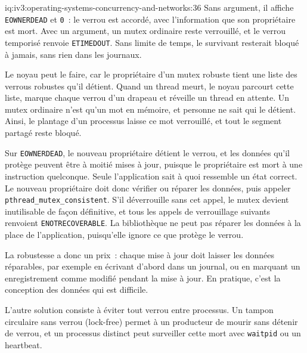 \begin{solution}{iq:iv3:operating-systems-concurrency-and-networks:36}
Sans argument, il affiche \texttt{EOWNERDEAD} et \texttt{0}~: le verrou est accordé, avec l'information que son propriétaire est mort. Avec un argument, un mutex ordinaire reste verrouillé, et le verrou temporisé renvoie \texttt{ETIMEDOUT}. Sans limite de temps, le survivant resterait bloqué à jamais, sans rien dans les journaux.

Le noyau peut le faire, car le propriétaire d'un mutex robuste tient une liste des verrous robustes qu'il détient. Quand un thread meurt, le noyau parcourt cette liste, marque chaque verrou d'un drapeau et réveille un thread en attente. Un mutex ordinaire n'est qu'un mot en mémoire, et personne ne sait qui le détient. Ainsi, le plantage d'un processus laisse ce mot verrouillé, et tout le segment partagé reste bloqué.

Sur \texttt{EOWNERDEAD}, le nouveau propriétaire détient le verrou, et les données qu'il protège peuvent être à moitié mises à jour, puisque le propriétaire est mort à une instruction quelconque. Seule l'application sait à quoi ressemble un état correct. Le nouveau propriétaire doit donc vérifier ou réparer les données, puis appeler \texttt{pthread\_mutex\_consistent}. S'il déverrouille sans cet appel, le mutex devient inutilisable de façon définitive, et tous les appels de verrouillage suivants renvoient \texttt{ENOTRECOVERABLE}. La bibliothèque ne peut pas réparer les données à la place de l'application, puisqu'elle ignore ce que protège le verrou.

La robustesse a donc un prix~: chaque mise à jour doit laisser les données réparables, par exemple en écrivant d'abord dans un journal, ou en marquant un enregistrement comme modifié pendant la mise à jour. En pratique, c'est la conception des données qui est difficile.

L'autre solution consiste à éviter tout verrou entre processus. Un tampon circulaire sans verrou (lock-free) permet à un producteur de mourir sans détenir de verrou, et un processus distinct peut surveiller cette mort avec \texttt{waitpid} ou un heartbeat.

\end{solution}

